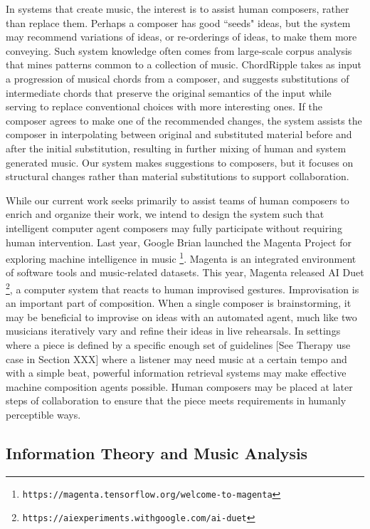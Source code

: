 \documentclass[final,authoryear,5p,times,twocolumn]{elsarticle}
\begin{document}
In systems that create music, the interest is to assist human composers, rather than replace them. Perhaps a composer has good ``seeds" ideas, but the system may recommend variations of ideas, or re-orderings of ideas, to make them more conveying. Such system knowledge often comes from large-scale corpus analysis that mines patterns common to a collection of music. ChordRipple \citep{huang2016chordripple} takes as input a progression of musical chords from a composer, and suggests substitutions of intermediate chords that preserve the original semantics of the input while serving to replace conventional choices with more interesting ones. If the composer agrees to make one of the recommended changes, the system assists the composer in interpolating between original and substituted material before and after the initial substitution, resulting in further mixing of human and system generated music. Our system makes suggestions to composers, but it focuses on structural changes rather than material substitutions to support collaboration.

While our current work seeks primarily to assist teams of human composers to enrich and organize their work, we intend to design the system such that intelligent computer agent composers may fully participate without requiring human intervention. Last year, Google Brian launched the Magenta Project for exploring machine intelligence in music \footnote{\texttt{https://magenta.tensorflow.org/welcome-to-magenta}}. Magenta is an integrated environment of software tools and music-related datasets. This year, Magenta released AI Duet \footnote{\texttt{https://aiexperiments.withgoogle.com/ai-duet}}, a computer system that reacts to human improvised gestures. Improvisation is an important part of composition. When a single composer is brainstorming, it may be beneficial to improvise on ideas with an automated agent, much like two musicians iteratively vary and refine their ideas in live rehearsals. In settings where a piece is defined by a specific enough set of guidelines [See Therapy use case in Section XXX]  where a listener may need music at a certain tempo and with a simple beat, powerful information retrieval systems may make effective machine composition agents possible. Human composers may be placed at later steps of collaboration to ensure that the piece meets requirements in humanly perceptible ways.

\subsection{Information Theory and Music Analysis}
\end{document}
